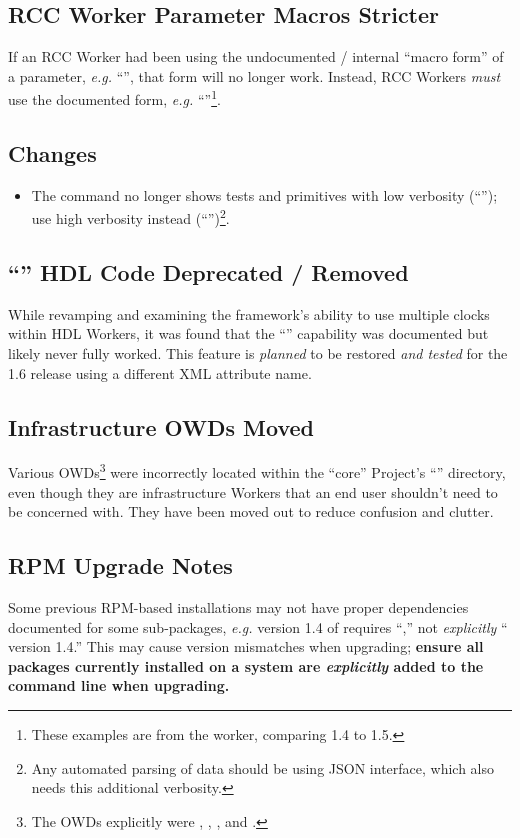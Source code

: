 \subsection{RCC Worker Parameter Macros Stricter} %
If an RCC Worker had been using the undocumented / internal ``macro form'' of a parameter, \textit{e.g.} ``'', that form will no longer work. Instead, RCC Workers \textit{must} use the documented form, \textit{e.g.} ``''\footnote{These examples are from the  worker, comparing 1.4 to 1.5.}.
\subsection{\ocpidev Changes}
\label{sec:15_ocpidev_changes}
\begin{itemize}
\setlength\itemsep{0em} %
\item The  command no longer shows tests and primitives with low verbosity (``''); use high verbosity instead (``'')\footnote{Any automated parsing of data should be using JSON interface, which also needs this additional verbosity.}. %
\end{itemize}
\subsection{``'' HDL Code Deprecated / Removed} %
\label{sec:15_myclock}
While revamping and examining the framework's ability to use multiple clocks within HDL Workers, it was found that the ``'' capability was documented but likely never fully worked. This feature is \textit{planned} to be restored \textit{and tested} for the 1.6 release using a different XML attribute name.
\subsection{Infrastructure OWDs Moved} %
Various OWDs\footnote{The OWDs explicitly were , , , and .} were incorrectly located within the ``core'' Project's ``'' directory, even though they are infra\-structure Workers that an end user shouldn't need to be concerned with. They have been moved out to reduce confusion and clutter.
\subsection{RPM Upgrade Notes} %
Some previous RPM-based installations may not have proper dependencies documented for some sub-packages, \textit{e.g.} version 1.4 of  requires ``,'' not \textit{explicitly} `` version 1.4.'' This may cause version mismatches when upgrading; \textbf{ensure all packages currently installed on a system are \textit{explicitly} added to the  command line when upgrading.}

